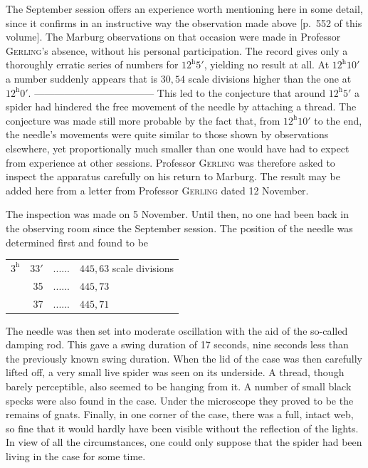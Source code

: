The September session offers an experience worth mentioning here in some detail, since it confirms in an instructive way the observation made above [p.\ 552 of this volume]. The Marburg observations on that occasion were made in Professor \textsc{Gerling}’s absence, without his personal participation. The record gives only a thoroughly erratic series of numbers for $12^{\mathrm h}5'$, yielding no result at all. At $12^{\mathrm h}10'$ a number suddenly appears that is $30{,}54$ scale divisions higher than the one at $12^{\mathrm h}0'$. ---\quad---\quad---\quad---\quad---\quad---\quad---\quad---\quad---\quad---\quad---\quad--- This led to the conjecture that around $12^{\mathrm h}5'$ a spider had hindered the free movement of the needle by attaching a thread. The conjecture was made still more probable by the fact that, from $12^{\mathrm h}10'$ to the end, the needle’s movements were quite similar to those shown by observations elsewhere, yet proportionally much smaller than one would have had to expect from experience at other sessions. Professor \textsc{Gerling} was therefore asked to inspect the apparatus carefully on his return to Marburg. The result may be added here from a letter from Professor \textsc{Gerling} dated 12 November.

The inspection was made on 5 November. Until then, no one had been back in the observing room since the September session. The position of the needle was determined first and found to be
\begin{center}
\begin{tabular}{rrc l}
$3^{\mathrm h}$&$33'$&.\quad.\quad.\quad.\quad.\quad.&$445{,}63$ scale divisions\\
&35&.\quad.\quad.\quad.\quad.\quad.&$445{,}73$\\
&37&.\quad.\quad.\quad.\quad.\quad.&$445{,}71$
\end{tabular}
\end{center}

The needle was then set into moderate oscillation with the aid of the so-called damping rod. This gave a swing duration of 17 seconds, nine seconds less than the previously known swing duration. When the lid of the case was then carefully lifted off, a very small live spider was seen on its underside. A thread, though barely perceptible, also seemed to be hanging from it. A number of small black specks were also found in the case. Under the microscope they proved to be the remains of gnats. Finally, in one corner of the case, there was a full, intact web, so fine that it would hardly have been visible without the reflection of the lights. In view of all the circumstances, one could only suppose that the spider had been living in the case for some time.

